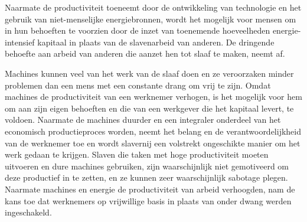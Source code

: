 Naarmate de productiviteit toeneemt door de ontwikkeling van technologie en het gebruik van niet-menselijke energiebronnen, wordt het mogelijk voor mensen om in hun behoeften te voorzien door de inzet van toenemende hoeveelheden energie-intensief kapitaal in plaats van de slavenarbeid van anderen. De dringende behoefte aan arbeid van anderen die aanzet hen tot slaaf te maken, neemt af.

Machines kunnen veel van het werk van de slaaf doen en ze veroorzaken minder problemen dan een mens met een constante drang om vrij te zijn. Omdat machines de productiviteit van een werknemer verhogen, is het mogelijk voor hem om aan zijn eigen behoeften en die van een werkgever die het kapitaal levert, te voldoen. Naarmate de machines duurder en een integraler onderdeel van het economisch productieproces worden, neemt het belang en de verantwoordelijkheid van de werknemer toe en wordt slavernij een volstrekt ongeschikte manier om het werk gedaan te krijgen. Slaven die taken met hoge productiviteit moeten uitvoeren en dure machines gebruiken, zijn waarschijnlijk niet gemotiveerd om deze productief in te zetten, en ze kunnen zeer waarschijnlijk sabotage plegen. Naarmate machines en energie de productiviteit van arbeid verhoogden, nam de kans toe dat werknemers op vrijwillige basis in plaats van onder dwang werden ingeschakeld.

